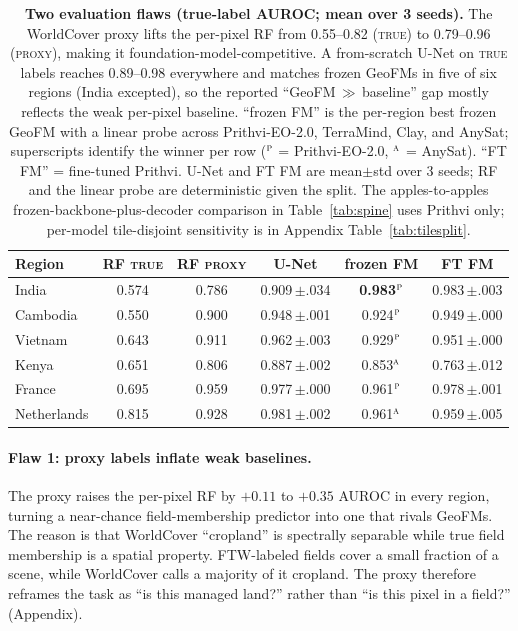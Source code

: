 \documentclass{article}
\begin{document}
\begin{table}[t]
\centering\small
\caption{\textbf{Two evaluation flaws (true-label AUROC; mean over 3 seeds).} The
WorldCover proxy lifts the per-pixel RF from 0.55--0.82 (\textsc{true}) to 0.79--0.96
(\textsc{proxy}), making it foundation-model-competitive. A from-scratch U-Net on
\textsc{true} labels reaches 0.89--0.98 everywhere and matches frozen GeoFMs in five
of six regions (India excepted), so the reported ``GeoFM\,$\gg$\,baseline'' gap
mostly reflects the weak per-pixel baseline. ``frozen FM'' is the per-region best
frozen GeoFM with a linear probe across Prithvi-EO-2.0, TerraMind, Clay, and AnySat;
superscripts identify the winner per row ($^{\textsc{p}}$ = Prithvi-EO-2.0,
$^{\textsc{a}}$ = AnySat). ``FT FM'' = fine-tuned Prithvi. U-Net and FT FM are
mean$\pm$std over 3 seeds; RF and the linear probe are deterministic given the split.
The apples-to-apples frozen-backbone-plus-decoder comparison in Table~\ref{tab:spine}
uses Prithvi only; per-model tile-disjoint sensitivity is in
Appendix Table~\ref{tab:tilesplit}.}
\label{tab:flaws}
\begin{tabular}{lccccc}
\toprule
Region & RF \textsc{true} & RF \textsc{proxy} & U-Net & frozen FM & FT FM \\
\midrule
India        & 0.574 & 0.786 & 0.909\,{\scriptsize$\pm$.034} & \textbf{0.983}$^{\textsc{p}}$ & 0.983\,{\scriptsize$\pm$.003} \\
Cambodia     & 0.550 & 0.900 & 0.948\,{\scriptsize$\pm$.001} & 0.924$^{\textsc{p}}$ & 0.949\,{\scriptsize$\pm$.000} \\
Vietnam      & 0.643 & 0.911 & 0.962\,{\scriptsize$\pm$.003} & 0.929$^{\textsc{p}}$ & 0.951\,{\scriptsize$\pm$.000} \\
Kenya        & 0.651 & 0.806 & 0.887\,{\scriptsize$\pm$.002} & 0.853$^{\textsc{a}}$ & 0.763\,{\scriptsize$\pm$.012} \\
France       & 0.695 & 0.959 & 0.977\,{\scriptsize$\pm$.000} & 0.961$^{\textsc{p}}$ & 0.978\,{\scriptsize$\pm$.001} \\
Netherlands  & 0.815 & 0.928 & 0.981\,{\scriptsize$\pm$.002} & 0.961$^{\textsc{a}}$ & 0.959\,{\scriptsize$\pm$.005} \\
\bottomrule
\end{tabular}
\end{table}

\paragraph{Flaw 1: proxy labels inflate weak baselines.} The proxy raises the
per-pixel RF by $+0.11$ to $+0.35$ AUROC in every region, turning a near-chance
field-membership predictor into one that rivals GeoFMs. The reason is that WorldCover
``cropland'' is spectrally separable while true field membership is a spatial
property. FTW-labeled fields cover a small fraction of a scene, while WorldCover
calls a majority of it cropland. The proxy therefore reframes the task as ``is this
managed land?'' rather than ``is this pixel in a field?'' (Appendix).
\end{document}
